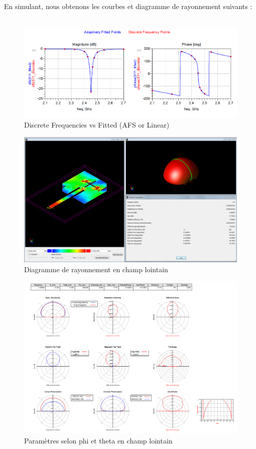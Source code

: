 \documentclass[16pt,a4paper,oneside,titlepage]{report}
\begin{document}
En simulant, nous obtenons les courbes et diagramme de rayonnement suivants :\\\\
\begin{figure}[h]
\center
\includegraphics[scale=0.5]{Images/P3_Q9-BON3.png}
\caption{Discrete Frequencies vs Fitted (AFS or Linear)}
\end{figure}

\begin{figure}[h]
\center
\includegraphics[scale=0.3]{Images/P3_Q9-BON1.png}
\caption{Diagramme de rayonnement en champ lointain}
\end{figure}

\begin{figure}[h]
\center
\includegraphics[scale=0.55]{Images/P3_Q9-BON2.png}
\caption{Paramètres selon phi et theta en champ lointain}
\end{figure}
\end{document}
